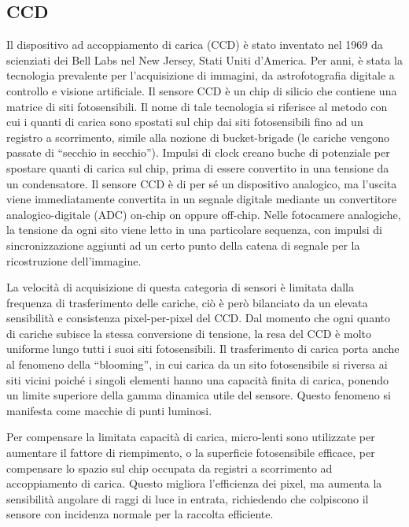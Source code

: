 \subsection{CCD} 
Il dispositivo ad accoppiamento di carica (CCD) è stato
inventato nel 1969 da scienziati dei Bell Labs nel New Jersey, Stati Uniti
d'America. Per anni, è stata la tecnologia prevalente per l'acquisizione di
immagini, da astrofotografia digitale a controllo e visione artificiale. Il
sensore CCD è un chip di silicio che contiene una matrice di siti
fotosensibili. Il nome di tale tecnologia si riferisce al metodo con cui i
quanti di carica sono spostati sul chip dai siti fotosensibili fino ad un
registro a scorrimento, simile alla nozione di bucket-brigade (le cariche
vengono passate di ``secchio in secchio''). Impulsi di clock creano buche di
potenziale per spostare quanti di carica sul chip, prima di essere convertito
in una tensione da un condensatore. Il sensore CCD è di per sé un dispositivo
analogico, ma l'uscita viene immediatamente convertita in un segnale digitale
mediante un convertitore analogico-digitale (ADC) on-chip on oppure off-chip.
Nelle fotocamere analogiche, la tensione da ogni sito viene letto in una
particolare sequenza, con impulsi di sincronizzazione aggiunti ad un certo
punto della catena di segnale per la ricostruzione dell'immagine.

La velocità di acquisizione di questa categoria di sensori è limitata dalla
frequenza di trasferimento delle cariche, ciò è però bilanciato da un elevata
sensibilità e consistenza pixel-per-pixel del CCD. Dal momento che ogni quanto
di cariche subisce la stessa conversione di tensione, la resa del CCD è molto
uniforme lungo tutti i suoi siti fotosensibili. Il trasferimento di carica
porta anche al fenomeno della ``blooming'', in cui carica da un sito
fotosensibile si riversa ai siti vicini poiché i singoli elementi hanno una
capacità finita di carica, ponendo un limite superiore della gamma dinamica
utile del sensore. Questo fenomeno si manifesta come macchie di punti
luminosi.

Per compensare la limitata capacità di carica, micro-lenti sono utilizzate per
aumentare il fattore di riempimento, o la superficie fotosensibile efficace,
per compensare lo spazio sul chip occupata da registri a scorrimento ad
accoppiamento di carica. Questo migliora l'efficienza dei pixel, ma aumenta la
sensibilità angolare di raggi di luce in entrata, richiedendo che colpiscono
il sensore con incidenza normale per la raccolta efficiente.



